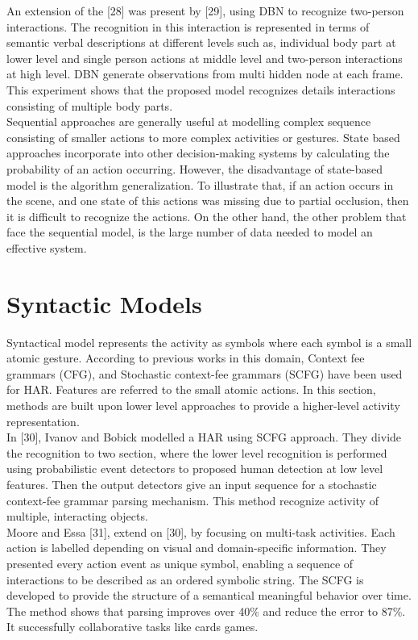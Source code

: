An extension of the [28] was present by [29], using DBN to recognize two-person interactions. The recognition in this interaction is represented in terms of semantic verbal descriptions at different levels such as, individual body part at lower level and single person actions at middle level and two-person interactions at high level. DBN generate observations from multi hidden node at each frame. This experiment shows that the proposed model recognizes details interactions consisting of multiple body parts.\\

Sequential approaches are generally useful at modelling complex sequence consisting of smaller actions to more complex activities or gestures. State based approaches incorporate into other decision-making systems by calculating the probability of an action occurring. However, the disadvantage of state-based model is the algorithm generalization. To illustrate that, if an action occurs in the scene, and one state of this actions was missing due to partial occlusion, then it is difficult to recognize the actions. On the other hand, the other problem that face the sequential model, is the large number of data needed to model an effective system. 

\section{Syntactic Models}
\hspace{5mm} Syntactical model represents the activity as symbols where each symbol is a small atomic gesture. According to previous works in this domain, Context fee grammars (CFG), and Stochastic context-fee grammars (SCFG) have been used for HAR. Features are referred to the small atomic actions. In this section, methods are built upon lower level approaches to provide a higher-level activity representation.\\

In [30], Ivanov and Bobick modelled a HAR using SCFG approach. They divide the recognition to two section, where the lower level recognition is performed using probabilistic event detectors to proposed human detection at low level features. Then the output detectors give an input sequence for a stochastic context-fee grammar parsing mechanism. This method recognize activity of multiple, interacting objects.\\

Moore and Essa [31], extend on [30], by focusing on multi-task activities. Each action is labelled depending on visual and domain-specific information. They presented every action event as unique symbol, enabling a sequence of interactions to be described as an ordered symbolic string. The SCFG is developed to provide the structure of a semantical meaningful behavior over time. The method shows that parsing improves over 40\% and reduce the error to 87\%. It successfully collaborative tasks like cards games.\\

